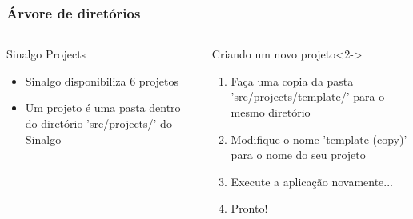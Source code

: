 \documentclass{beamer}
\begin{document}
\begin{frame}
	\frametitle{Árvore de diretórios}
\begin{columns}[c] %

	\begin{block}{Sinalgo Projects}
	\small
		\begin{itemize}
			\item Sinalgo disponibiliza 6 projetos
			\item Um projeto é uma pasta dentro do diretório 'src/projects/' do Sinalgo
		\end{itemize}
	\end{block}
	
	\begin{exampleblock}{Criando um novo projeto}<2->
	\small
		\begin{enumerate}
			\item Faça uma copia da pasta 'src/projects/template/' para o mesmo diretório
			\item Modifique o nome 'template (copy)' para o nome do seu projeto
			
			\item Execute a aplicação novamente...
						
			\item Pronto!
		\end{enumerate}
	\end{exampleblock}
	


\end{columns}
\end{frame}
\end{document}
